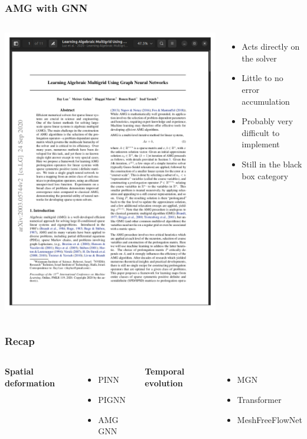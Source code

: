 \documentclass{beamer}
\begin{document}
\begin{frame}
    \frametitle{AMG with GNN}
\begin{columns}
\includegraphics[scale=0.1]{figures/AMG.png}

\begin{itemize}
    \item Acts directly on the solver
    \item Little to no error accumulation
    \item Probably very difficult to implement
    \item Still in the black box category
\end{itemize}
\end{columns}
\end{frame}

\begin{frame}
    \frametitle{Recap}
\begin{columns}
\centering \textbf{Spatial deformation}
\begin{itemize}
    \item PINN
    \item PIGNN
    \item AMG GNN
\end{itemize}
\centering \textbf{Temporal evolution}
\begin{itemize}
    \item MGN
    \item Transformer
    \item MeshFreeFlowNet
\end{itemize}
\end{columns}
\end{frame}
\end{document}

